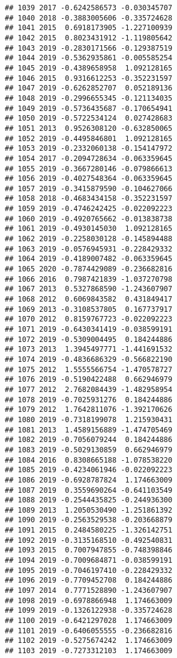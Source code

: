 \documentclass[
]{article}
\begin{document}
\begin{verbatim}
## 1039 2017 -0.6242586573 -0.030345707
## 1040 2018 -0.3883005606 -0.335724628
## 1041 2015  0.6918173905 -1.227100939
## 1042 2015  0.8023431912 -1.119805642
## 1043 2019 -0.2830171566 -0.129387519
## 1044 2019 -0.5362935861 -0.005585254
## 1045 2019 -0.4389658958  1.092128165
## 1046 2015  0.9316612253 -0.352231597
## 1047 2019 -0.6262852707  0.052189136
## 1048 2019 -0.2996655345 -0.121134035
## 1049 2019 -0.5736435687 -0.170654941
## 1050 2019 -0.5722534124  0.027428683
## 1051 2013  0.9526308120 -0.632850065
## 1052 2019 -0.4495846801  1.092128165
## 1053 2019 -0.2332060138 -0.154147972
## 1054 2017 -0.2094728634 -0.063359645
## 1055 2019 -0.3667280146 -0.079866613
## 1056 2019 -0.4027548364 -0.063359645
## 1057 2019 -0.3415879590 -0.104627066
## 1058 2018 -0.4683434158 -0.352231597
## 1059 2019 -0.4746242425 -0.022092223
## 1060 2019 -0.4920765662 -0.013838738
## 1061 2019 -0.4930145030  1.092128165
## 1062 2019 -0.2258030128 -0.145894488
## 1063 2019 -0.0576945931 -0.228429332
## 1064 2019 -0.4189007482 -0.063359645
## 1065 2020 -0.7874429089 -0.236682816
## 1066 2016  0.7987421839 -1.037270798
## 1067 2013  0.5327868590 -1.243607907
## 1068 2012  0.6069843582  0.431849417
## 1069 2013 -0.3108537805  0.167737917
## 1070 2012  0.8159767723 -0.022092223
## 1071 2019 -0.6430341419 -0.038599191
## 1072 2019 -0.5309004495  0.184244886
## 1073 2013  1.3945497771 -1.441691532
## 1074 2019 -0.4836686329 -0.566822190
## 1075 2012  1.5555566754 -1.470578727
## 1076 2019 -0.5190422488  0.662946979
## 1077 2012  2.7682084439 -1.482958954
## 1078 2019 -0.7025931276  0.184244886
## 1079 2012  1.7642811076 -1.392170626
## 1080 2019 -0.7318199078  1.215930431
## 1081 2013  1.4589156889 -1.474705469
## 1082 2019 -0.7056079244  0.184244886
## 1083 2019 -0.5029130859  0.662946979
## 1084 2016  0.8308665188 -1.078538220
## 1085 2019 -0.4234061946 -0.022092223
## 1086 2019 -0.6928787824  1.174663009
## 1087 2019  0.3559690264 -0.641103549
## 1088 2019 -0.2544435825 -0.244936300
## 1089 2013  1.2050530490 -1.251861392
## 1090 2019 -0.2563529538 -0.203668879
## 1091 2015  0.2484580225 -1.326142751
## 1092 2019 -0.3135168510 -0.492540831
## 1093 2015  0.7007947855 -0.748398846
## 1094 2019 -0.7009684871 -0.038599191
## 1095 2019 -0.7046197410 -0.228429332
## 1096 2019 -0.7709452708  0.184244886
## 1097 2014  0.7771528890 -1.243607907
## 1098 2019 -0.6978866948  1.174663009
## 1099 2019 -0.1326122938 -0.335724628
## 1100 2019 -0.6421297028  1.174663009
## 1101 2019 -0.6406055555 -0.236682816
## 1102 2019 -0.5275674242  1.174663009
## 1103 2019 -0.7273312103  1.174663009

\end{verbatim}
\end{document}
